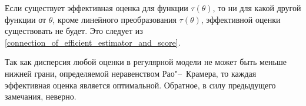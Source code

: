 \begin{rmrk}
    Если существует эффективная оценка для функции $\tau(\theta)$, то ни для какой другой функции от $\theta$, кроме линейного преобразования $\tau(\theta)$, эффективной оценки существовать не будет. 
    Это следует из \eqref{connection_of_efficient_estimator_and_score}.
\end{rmrk}
Так как дисперсия любой оценки в регулярной модели не может быть меньше нижней грани, определяемой неравенством Рао"--~Крамера, то каждая эффективная оценка является оптимальной.
Обратное, в силу предыдущего замечания, неверно.
